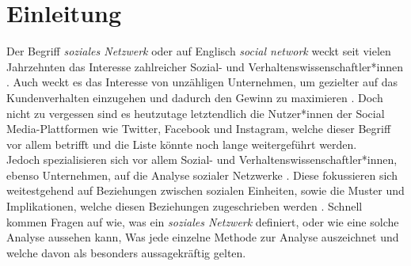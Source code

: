 \chapter{Einleitung}\label{ch:einleitung}
Der Begriff \textit{soziales Netzwerk} oder auf Englisch \textit{social network} weckt seit vielen Jahrzehnten das Interesse zahlreicher Sozial- und Verhaltenswissenschaftler*innen \cite{SNAIntroduction}. Auch weckt es das Interesse von unzähligen Unternehmen, um gezielter auf das Kundenverhalten einzugehen und dadurch den Gewinn zu maximieren \cite{CompanySNA}. Doch nicht zu vergessen sind es heutzutage letztendlich die Nutzer*innen der Social Media-Plattformen wie Twitter, Facebook und Instagram, welche dieser Begriff vor allem betrifft und die Liste könnte noch lange weitergeführt werden.\\
Jedoch spezialisieren sich vor allem Sozial- und Verhaltenswissenschaftler*innen, ebenso Unternehmen, auf die Analyse sozialer Netzwerke \cite{SNAIntroduction, CompanySNA}. Diese fokussieren sich weitestgehend auf Beziehungen zwischen sozialen Einheiten, sowie die Muster und Implikationen, welche diesen Beziehungen zugeschrieben werden \cite{networkPattern}.
Schnell kommen Fragen auf wie, was ein \textit{soziales Netzwerk} definiert, oder wie eine solche Analyse aussehen kann, Was jede einzelne Methode zur Analyse auszeichnet und welche davon als besonders aussagekräftig gelten.


